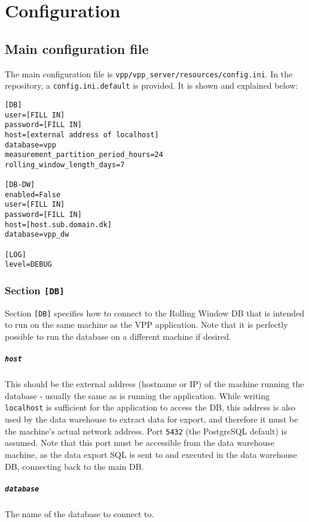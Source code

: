 \chapter{Configuration} \label{ch:configuration}

\section{Main configuration file}
The main configuration file is \texttt{vpp/vpp\_server/resources/config.ini}.
In the repository, a \texttt{config.ini.default} is provided. It is shown and explained below:

\lstset{language=C, basicstyle=\ttfamily}  
\begin{lstlisting}
[DB]
user=[FILL IN]
password=[FILL IN]
host=[external address of localhost] 
database=vpp
measurement_partition_period_hours=24 
rolling_window_length_days=7

[DB-DW]
enabled=False
user=[FILL IN]
password=[FILL IN]
host=[host.sub.domain.dk]
database=vpp_dw

[LOG]
level=DEBUG
\end{lstlisting}

\subsection{Section \texttt{[DB]}}
Section \texttt{[DB]} specifies how to connect to the Rolling Window DB that is intended to run on the same machine as the VPP application. Note that it is perfectly possible to run the database on a different machine if desired.

\paragraph{\texttt{host}} This should be the external address (hostname or IP) of the machine running the database - usually the same as is running the application. While writing \texttt{localhost} is sufficient for the application to access the DB, this address is also used by the data warehouse to extract data for export, and therefore it must be the machine's actual network address.
Port \texttt{5432} (the PostgreSQL default) is assumed. Note that this port must be accessible from the data warehouse machine, as the data export SQL is sent to and executed in the data warehouse DB, connecting back to the main DB.

\paragraph{\texttt{database}} The name of the database to connect to. 


